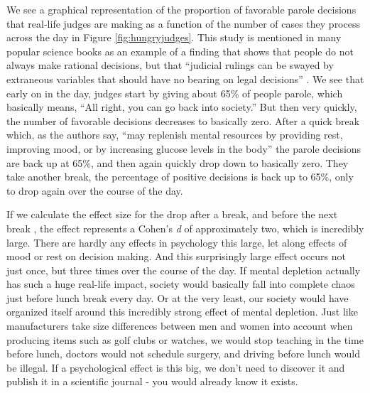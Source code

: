 \documentclass[
  oneside]{book}
\begin{document}
We see a graphical representation of the proportion of favorable parole decisions that real-life judges are making as a function of the number of cases they process across the day in Figure \ref{fig:hungryjudges}. This study is mentioned in many popular science books as an example of a finding that shows that people do not always make rational decisions, but that ``judicial rulings can be swayed by extraneous variables that should have no bearing on legal decisions'' \citep{danziger_extraneous_2011}. We see that early on in the day, judges start by giving about 65\% of people parole, which basically means, ``All right, you can go back into society.'' But then very quickly, the number of favorable decisions decreases to basically zero. After a quick break which, as the authors say, ``may replenish mental resources by providing rest, improving mood, or by increasing glucose levels in the body'' the parole decisions are back up at 65\%, and then again quickly drop down to basically zero. They take another break, the percentage of positive decisions is back up to 65\%, only to drop again over the course of the day.

If we calculate the effect size for the drop after a break, and before the next break \citep{glockner_irrational_2016}, the effect represents a Cohen's \emph{d} of approximately two, which is incredibly large. There are hardly any effects in psychology this large, let along effects of mood or rest on decision making. And this surprisingly large effect occurs not just once, but three times over the course of the day. If mental depletion actually has such a huge real-life impact, society would basically fall into complete chaos just before lunch break every day. Or at the very least, our society would have organized itself around this incredibly strong effect of mental depletion. Just like manufacturers take size differences between men and women into account when producing items such as golf clubs or watches, we would stop teaching in the time before lunch, doctors would not schedule surgery, and driving before lunch would be illegal. If a psychological effect is this big, we don't need to discover it and publish it in a scientific journal - you would already know it exists.
\end{document}
